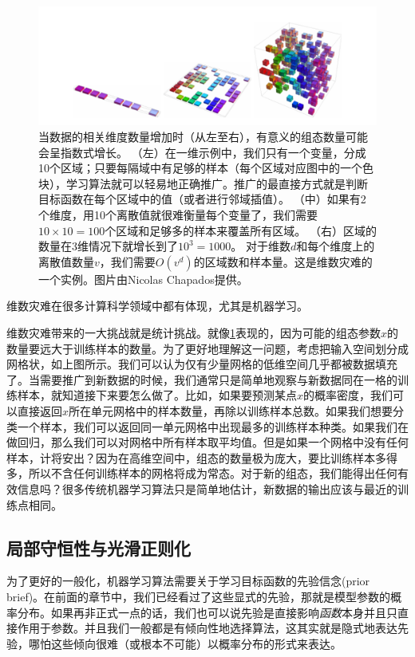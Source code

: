 \begin{figure}[htbp]
   \centering
   \includegraphics[width=6in]{fig/chap5/5_9.png} 
   \caption{当数据的相关维度数量增加时（从左至右），有意义的组态数量可能会呈指数式增长。
   （左）在一维示例中，我们只有一个变量，分成10个区域；只要每隔域中有足够的样本（每个区域对应图中的一个色块），学习算法就可以轻易地正确推广。推广的最直接方式就是判断目标函数在每个区域中的值（或者进行邻域插值）。
   （中）如果有2个维度，用10个离散值就很难衡量每个变量了，我们需要$10\times 10=100$个区域和足够多的样本来覆盖所有区域。
   （右）区域的数量在3维情况下就增长到了$10^3=1000$。
   对于维数$d$和每个维度上的离散值数量$v$，我们需要$O(v^d)$的区域数和样本量。这是维数灾难的一个实例。图片由Nicolas Chapados提供。}
   \label{fig:5_9}
\end{figure}


维数灾难在很多计算科学领域中都有体现，尤其是机器学习。

维数灾难带来的一大挑战就是统计挑战。就像\ref{fig:5_9}表现的，因为可能的组态参数$x$的数量要远大于训练样本的数量。为了更好地理解这一问题，考虑把输入空间划分成网格状，如上图所示。我们可以认为仅有少量网格的低维空间几乎都被数据填充了。当需要推广到新数据的时候，我们通常只是简单地观察与新数据同在一格的训练样本，就知道接下来要怎么做了。比如，如果要预测某点$x$的概率密度，我们可以直接返回$x$所在单元网格中的样本数量，再除以训练样本总数。如果我们想要分类一个样本，我们可以返回同一单元网格中出现最多的训练样本种类。如果我们在做回归，那么我们可以对网格中所有样本取平均值。但是如果一个网格中没有任何样本，计将安出？因为在高维空间中，组态的数量极为庞大，要比训练样本多得多，所以不含任何训练样本的网格将成为常态。对于新的组态，我们能得出任何有效信息吗？很多传统机器学习算法只是简单地估计，新数据的输出应该与最近的训练点相同。

\subsection{局部守恒性与光滑正则化}
\label{sec:5.11.2}

为了更好的一般化，机器学习算法需要关于学习目标函数的先验信念(prior brief)。在前面的章节中，我们已经看过了这些显式的先验，那就是模型参数的概率分布。如果再非正式一点的话，我们也可以说先验是直接影响\textit{函数}本身并且只直接作用于参数。并且我们一般都是有倾向性地选择算法，这其实就是隐式地表达先验，哪怕这些倾向很难（或根本不可能）以概率分布的形式来表达。

